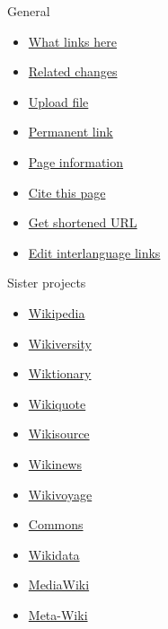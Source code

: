 \documentclass[11pt,a4paper]{article}
\begin{document}
General

\begin{itemize}
\item \href{https://en.wikibooks.org/wiki/Special:WhatLinksHere/Cookbook:Chicken\_Tikka}{What links here}
\item \href{https://en.wikibooks.org/wiki/Special:RecentChangesLinked/Cookbook:Chicken\_Tikka}{Related changes}
\item \href{https://commons.wikimedia.org/wiki/Special:UploadWizard?uselang=en}{Upload file}
\item \href{https://en.wikibooks.org/w/index.php?title=Cookbook:Chicken\_Tikka\&oldid=4615207}{Permanent link}
\item \href{https://en.wikibooks.org/w/index.php?title=Cookbook:Chicken\_Tikka\&action=info}{Page information}
\item \href{https://en.wikibooks.org/w/index.php?title=Special:CiteThisPage\&page=Cookbook\%3AChicken\_Tikka\&id=4615207\&wpFormIdentifier=titleform}{Cite this page}
\item \href{https://en.wikibooks.org/w/index.php?title=Special:UrlShortener\&url=https\%3A\%2F\%2Fen.wikibooks.org\%2Fwiki\%2FCookbook\%3AChicken\_Tikka}{Get shortened URL}
\item \href{https://www.wikidata.org/wiki/Special:EntityPage/Q2548408\#sitelinks-wikibooks}{Edit interlanguage links}
\end{itemize}

Sister projects

\begin{itemize}
\item \href{https://en.wikipedia.org/wiki/Main\_Page}{Wikipedia}
\item \href{https://en.wikiversity.org/wiki/Wikiversity:Main\_Page}{Wikiversity}
\item \href{https://en.wiktionary.org/wiki/Wiktionary:Main\_Page}{Wiktionary}
\item \href{https://en.wikiquote.org/wiki/Main\_Page}{Wikiquote}
\item \href{https://en.wikisource.org/wiki/Main\_Page}{Wikisource}
\item \href{https://en.wikinews.org/wiki/Main\_Page}{Wikinews}
\item \href{https://en.wikivoyage.org/wiki/Main\_Page}{Wikivoyage}
\item \href{https://commons.wikimedia.org/wiki/Main\_Page}{Commons}
\item \href{https://www.wikidata.org/wiki/Wikidata:Main\_Page}{Wikidata}
\item \href{https://www.mediawiki.org/wiki/Main\_Page}{MediaWiki}
\item \href{https://meta.wikimedia.org/wiki/Main\_Page}{Meta-Wiki}
\end{itemize}
\end{document}
